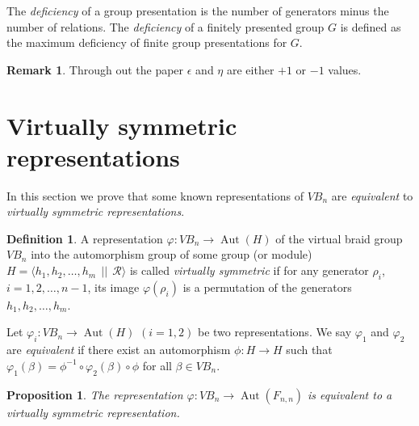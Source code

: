 \documentclass[11 pt, reqno]{amsart}
\newtheorem{proposition}[theorem]{Proposition}
\theoremstyle{definition}
\newtheorem{definition}[theorem]{Definition}
\newtheorem{remark}[theorem]{Remark}
\numberwithin{equation}{subsection}
\newcommand{\Aut}{\operatorname{Aut}}
\begin{document}
The {\it deficiency} of a group presentation is the number of generators minus the number of relations. The {\it deficiency} of a finitely presented group $G$ is defined as the maximum deficiency of finite group presentations for $G$. 
\par 

\begin{remark}
Through out the paper $\epsilon$ and $\eta$ are either $+1$ or $-1$ values.
\end{remark}

\medskip




\section{Virtually symmetric representations}\label{S: Virtually symmetric representations}

In this section we prove that some known representations of $VB_n$ are {\it equivalent} to {\it virtually symmetric representations}.

\begin{definition}
A representation $\varphi : VB_n \to \Aut(H)$ of the virtual braid group $VB_n$ into the automorphism group of some group (or module) $H=\langle h_1, h_2, \ldots, h_m~~||~~\mathcal{R}\rangle$ is called {\it virtually symmetric} if for any generator $\rho_i$, $i=1, 2, \ldots, n-1$, its image $\varphi(\rho_i)$ is a permutation of the generators  $h_1, h_2, \ldots, h_m$.
\end{definition}

Let $\varphi_i: VB_n \to \Aut(H)$ $(i=1,2)$ be two representations. We say $\varphi_1$ and $\varphi_2$ are {\it equivalent} if there exist an automorphism $\phi: H \to H$ such that $\varphi_1(\beta)= \phi^{-1} \circ \varphi_2(\beta) \circ \phi$ for all $\beta \in VB_n$.

\begin{proposition}\label{P: main-representation-in-file}
The representation $\varphi: VB_n \rightarrow \Aut(F_{n,n})$
 is equivalent to a virtually symmetric representation.
\end{proposition}
\end{document}
